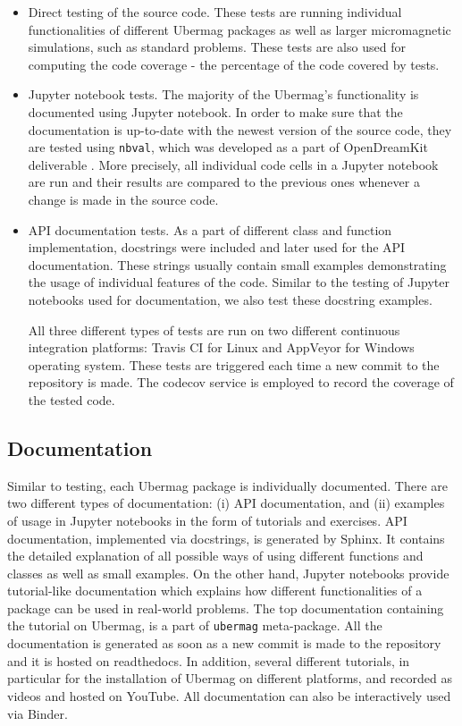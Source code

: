 \documentclass{deliverablereport}
\begin{document}
\begin{itemize}
\item Direct testing of the source code. These tests are running
individual functionalities of different Ubermag packages as well as
larger micromagnetic simulations, such as standard problems. These
tests are also used for computing the code coverage - the percentage
of the code covered by tests.
\item Jupyter notebook tests. The majority of the Ubermag's
functionality is documented using Jupyter notebook. In order to make
sure that the documentation is up-to-date with the newest version of
the source code, they are tested using \texttt{nbval}, which was
developed as a part of OpenDreamKit deliverable
. More precisely, all individual code cells
in a Jupyter notebook are run and their results are compared to the
previous ones whenever a change is made in the source code.
\item API documentation tests. As a part of different class and
  function implementation, docstrings were included and later used for
  the API documentation. These strings usually contain small examples
  demonstrating the usage of individual features of the code. Similar
  to the testing of Jupyter notebooks used for documentation, we also
  test these docstring examples.

  All three different types of tests are run on two different continuous integration platforms: Travis CI for Linux and AppVeyor for Windows operating system. These tests are triggered each time a new commit to the repository is made. The codecov service is employed to record the coverage of the tested code.
\end{itemize}

\subsection{Documentation}

Similar to testing, each Ubermag package is individually
documented. There are two different types of documentation: (i) API
documentation, and (ii) examples of usage in Jupyter notebooks in the
form of tutorials and exercises. API documentation, implemented via
docstrings, is generated by Sphinx. It contains the detailed
explanation of all possible ways of using different functions and
classes as well as small examples. On the other hand, Jupyter
notebooks provide tutorial-like documentation which explains how
different functionalities of a package can be used in real-world
problems. The top documentation containing the tutorial on Ubermag, is
a part of \texttt{ubermag} meta-package. All the documentation is
generated as soon as a new commit is made to the repository and it is
hosted on readthedocs. In addition, several different tutorials, in
particular for the installation of Ubermag on different platforms, and
recorded as videos and hosted on YouTube. All documentation can also
be interactively used via Binder.
\end{document}
